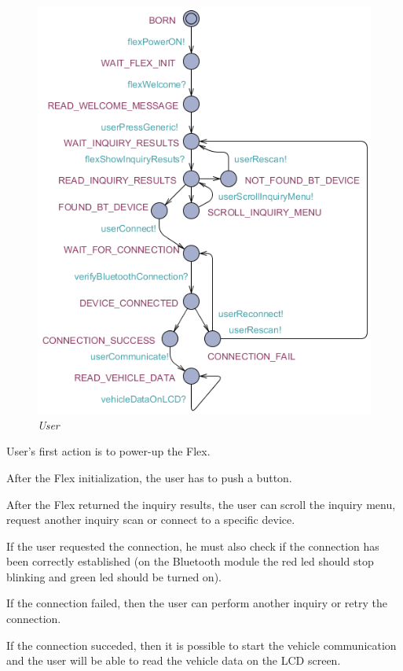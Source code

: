\documentclass[paper=a4, fontsize=11pt]{scrartcl} %
\numberwithin{equation}{section} %
\numberwithin{figure}{section} %
\numberwithin{table}{section} %
\begin{document}
\begin{figure}[H]
  \centering
  \includegraphics[width=4.7in]{img/FLEX-OBD-LCD_user}
  \caption{\textit{User}}
\end{figure}

User's first action is to power-up the Flex.

After the Flex initialization, the user has to push a button.

After the Flex returned the inquiry results, the user can scroll the inquiry menu, request another inquiry scan or connect to a specific device.

If the user requested the connection, he must also check if the connection has been correctly established (on the Bluetooth module the red led should stop blinking and green led should be turned on).

If the connection failed, then the user can perform another inquiry or retry the connection.

If the connection succeded, then it is possible to start the vehicle communication and the user will be able to read the vehicle data on the LCD screen.
\end{document}
